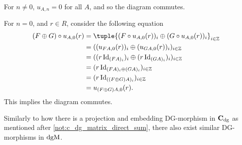 \begin{remark}
\begin{itemize}
{            For \( n \neq 0 \), \( u_{A, n} = 0 \) for all \( A \), and so the diagram commutes.

            For \( n = 0 \), and \( r \in R \), consider the following equation
            \begin{align*}
                (F \oplus G) \circ u_{A, 0} (r) &= \tuple{ (F \circ u_{A, 0} (r))_i \oplus (G \circ u_{A, 0} (r))_i }_{i \in \Zb} \\
                &= ((u_{F A, 0} (r))_i \oplus (u_{G A, 0} (r))_i)_{i \in \Zb} \\
                &= ((r \Id_{(F A)_i})_i \oplus (r \Id_{(G A)_i})_i)_{i \in \Zb} \\
                &= (r \Id_{(F A)_i \oplus (G A)_i})_{i \in \Zb} \\
                &= (r \Id_{((F \oplus G ) A)_i })_{i \in \Zb} \\
                &= u_{(F \oplus G ) A, 0} (r).
            \end{align*}
            This implies the diagram commutes.
        }
    \end{itemize}
\end{remark}

Similarly to how there is a projection and embedding DG-morphism in \( \operatorname{\mathbf{C}}_{\operatorname{dg}} \) as mentioned after \autoref{not:c_dg_matrix_direct_sum}, there also exist similar DG-morphisms in \( \operatorname{dgM} \).

